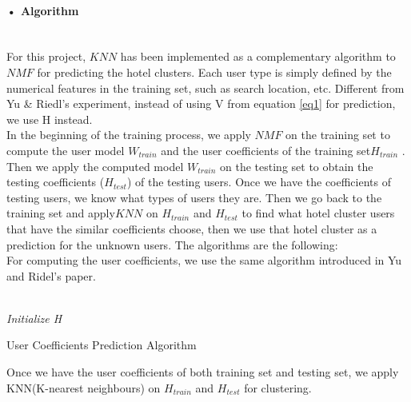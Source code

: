 \documentclass[11pt]{article} %
\begin{document}
\paragraph{• Algorithm}\mbox{}\\
For this project, $KNN$ has been implemented as a complementary algorithm to $NMF$ for predicting the hotel clusters. Each user type is simply defined by the numerical features in the training set, such as search location, etc. Different from Yu \& Riedl's experiment, instead of using V from equation \ref{eq1} for prediction, we use H instead.\\
In the beginning of the training process, we apply $NMF$ on the training set to compute the user model $W_{train}$ and the user coefficients of the training set$H_{train}$ . Then we apply the computed model $W_{train}$ on the testing set to obtain the testing coefficients ($H_{test}$) of the testing users. Once we have the coefficients of testing users, we know what types of users they are. Then we go back to the training set and apply$KNN$ on $H_{train}$ and $H_{test}$ to find what hotel cluster users that have the similar coefficients choose, then we use that hotel cluster as a prediction for the unknown users. The algorithms are the following:\\
For computing the user coefficients, we use the same algorithm \cite[p.6]{nmf1} introduced in Yu and Ridel's paper. \\\\
\begin{algorithm}[H]
\BlankLine
\emph{Initialize H}\;
\caption{User Coefficients Prediction Algorithm}\label{H}
\end{algorithm}\mbox{}
Once we have the user coefficients of both training set and testing set, we apply KNN(K-nearest neighbours) on $H_{train}$ and $H_{test}$ for clustering.\\
\end{document}
